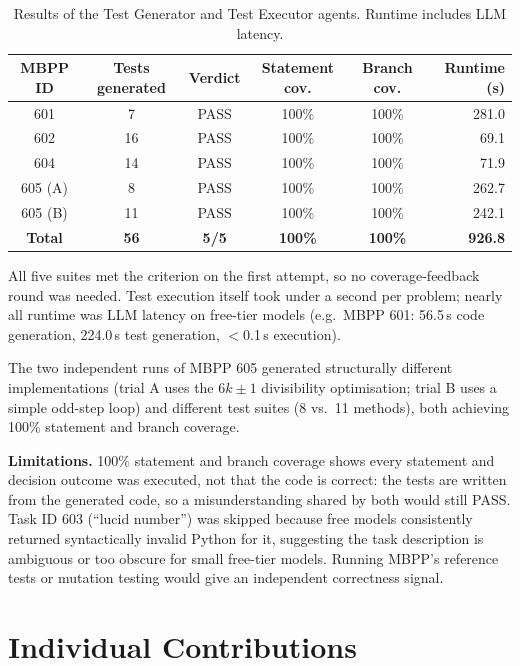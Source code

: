 \documentclass[11pt,a4paper]{article}
\begin{document}
\begin{table}[H]
\centering\small
\begin{tabular}{c c c c c r}
\toprule
MBPP ID & Tests generated & Verdict & Statement cov. & Branch cov. & Runtime (s)\\
\midrule
601         &  7 & PASS & 100\% & 100\% & 281.0\\
602         & 16 & PASS & 100\% & 100\% &  69.1\\
604         & 14 & PASS & 100\% & 100\% &  71.9\\
605 (A)     &  8 & PASS & 100\% & 100\% & 262.7\\
605 (B)     & 11 & PASS & 100\% & 100\% & 242.1\\
\midrule
\textbf{Total} & \textbf{56} & \textbf{5/5} & \textbf{100\%} & \textbf{100\%} & \textbf{926.8}\\
\bottomrule
\end{tabular}
\caption{Results of the Test Generator and Test Executor agents. Runtime includes LLM latency.}
\end{table}

All five suites met the criterion on the first attempt, so no coverage-feedback round
was needed. Test execution itself took under a second per problem; nearly all runtime
was LLM latency on free-tier models (e.g.\ MBPP 601: 56.5\,s code generation,
224.0\,s test generation, $<$0.1\,s execution).

The two independent runs of MBPP 605 generated structurally different implementations
(trial A uses the $6k\pm1$ divisibility optimisation; trial B uses a simple odd-step
loop) and different test suites (8 vs.\ 11 methods), both achieving 100\% statement
and branch coverage.

\textbf{Limitations.} 100\% statement and branch coverage shows every statement and
decision outcome was executed, not that the code is correct: the tests are written
from the generated code, so a misunderstanding shared by both would still PASS\@. Task ID
603 (``lucid number'') was skipped because free models consistently returned
syntactically invalid Python for it, suggesting the task description is ambiguous or
too obscure for small free-tier models. Running MBPP's reference tests or mutation
testing would give an independent correctness signal.

\section{Individual Contributions}
\end{document}
